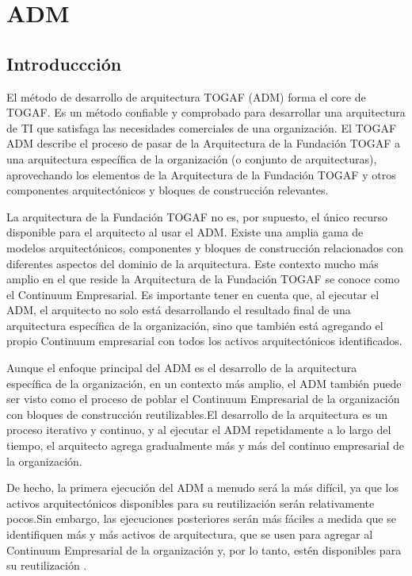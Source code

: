 \chapter{ADM}
\section{Introduccción}
El método de desarrollo de arquitectura TOGAF (ADM) forma el core de TOGAF. Es un método confiable y comprobado para desarrollar una arquitectura de TI que satisfaga las necesidades comerciales de una organización. El TOGAF ADM describe el proceso de pasar de la Arquitectura de la Fundación TOGAF a una arquitectura específica de la organización (o conjunto de arquitecturas), aprovechando los elementos de la Arquitectura de la Fundación TOGAF y otros componentes arquitectónicos y bloques de construcción relevantes.

La arquitectura de la Fundación TOGAF no es, por supuesto, el único recurso disponible para el arquitecto al usar el ADM. Existe una amplia gama de modelos arquitectónicos, componentes y bloques de construcción relacionados con diferentes aspectos del dominio de la arquitectura. Este contexto mucho más amplio en el que reside la Arquitectura de la Fundación TOGAF se conoce como el Continuum Empresarial. Es importante tener en cuenta que, al ejecutar el ADM, el arquitecto no solo está desarrollando el resultado final de una arquitectura específica de la organización, sino que también está agregando el propio Continuum empresarial con todos los activos arquitectónicos identificados. 

Aunque el enfoque principal del ADM es el desarrollo de la arquitectura específica de la organización, en un contexto más amplio, el ADM también puede ser visto como el proceso de poblar el  Continuum Empresarial de la organización con bloques de construcción reutilizables.El desarrollo de la arquitectura es un proceso iterativo y continuo, y al ejecutar el ADM repetidamente a lo largo del tiempo, el arquitecto agrega gradualmente más y más del continuo empresarial de la organización.

De hecho, la primera ejecución del ADM a menudo será la más difícil, ya que los activos arquitectónicos disponibles para su reutilización serán relativamente pocos.Sin embargo, las ejecuciones posteriores serán más fáciles a medida que se identifiquen más y más activos de arquitectura, que se usen para agregar al Continuum Empresarial de la organización y, por lo tanto, estén disponibles para su reutilización \cite{TheOpenGroup2001}.

